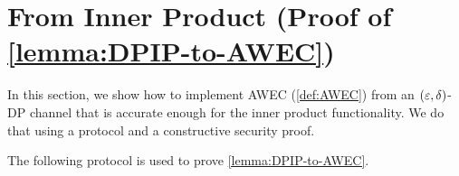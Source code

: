 \newcommand{\GenRand}{\MathAlgX{GenRand}}
\newcommand{\GenView}{\MathAlgX{GenView}}

\section{\AWEC From \DP Inner Product (Proof of \cref{lemma:DPIP-to-AWEC})}\label{sec:DPIP_to_WAEC}

In this section, we show how to implement AWEC (\cref{def:AWEC}) from an $(\varepsilon,\delta)$-DP channel that is accurate enough for the inner product functionality. We do that using a \ppt protocol and a constructive security proof.










The following protocol is used to prove \cref{lemma:DPIP-to-AWEC}.

